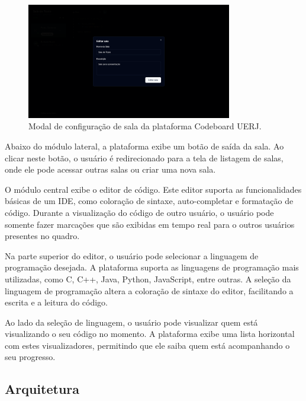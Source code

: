 \begin{figure}[H]
    \centering
    \includegraphics[width=0.8\textwidth]{assets/codeboard/edit-room-modal.png}
    \caption{Modal de configuração de sala da plataforma Codeboard UERJ.}
    \label{fig:edit-room-modal}
\end{figure}


Abaixo do módulo lateral, a plataforma exibe um botão de saída da sala. Ao clicar neste botão, o usuário é redirecionado para a tela de listagem de salas, onde ele pode acessar outras salas ou criar uma nova sala.

O módulo central exibe o editor de código. Este editor suporta as funcionalidades básicas de um IDE, como coloração de sintaxe, auto-completar e formatação de código. Durante a visualização do código de outro usuário, o usuário pode somente fazer marcações que são exibidas em tempo real para o outros usuários presentes no quadro.


Na parte superior do editor, o usuário pode selecionar a linguagem de programação desejada. A plataforma suporta as linguagens de programação mais utilizadas, como C, C++, Java, Python, JavaScript, entre outras. A seleção da linguagem de programação altera a coloração de sintaxe do editor, facilitando a escrita e a leitura do código.


Ao lado da seleção de linguagem, o usuário pode visualizar quem está visualizando o seu código no momento. A plataforma exibe uma lista horizontal com estes visualizadores, permitindo que ele saiba quem está acompanhando o seu progresso.


\subsection{Arquitetura}

